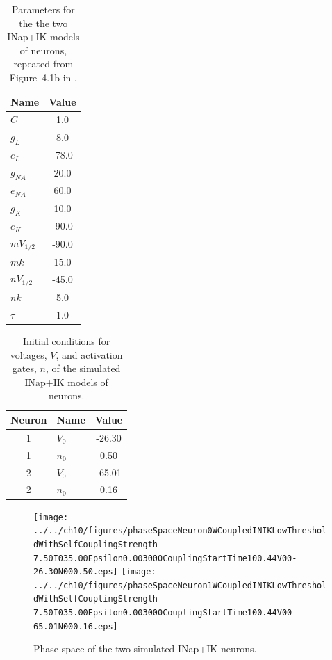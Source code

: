 \documentclass{article}
\begin{document}
\begin{table}
\begin{center}
\begin{tabular}{|l|c|}\hline
\multicolumn{1}{|c}{Name} & \multicolumn{1}{|c|}{Value}\\ \hline \hline
$C$ & 1.0 \\ \hline
$g_L$ & 8.0 \\ \hline
$e_L$ & -78.0 \\ \hline
$g_{NA}$ & 20.0 \\ \hline
$e_{NA}$ & 60.0 \\ \hline
$g_{K}$ & 10.0 \\ \hline
$e_{K}$ & -90.0 \\ \hline
$mV_{1/2}$ & -90.0 \\ \hline
$mk$ & 15.0 \\ \hline
$nV_{1/2}$ & -45.0 \\ \hline
$nk$ & 5.0 \\ \hline
$\tau$ & 1.0 \\ \hline
\end{tabular}
\end{center}
\caption{Parameters for the the two INap+IK models of neurons, repeated from
Figure~4.1b in \citet{izhikevich07}.}
\label{table:INapIKParams}
\end{table}

\begin{table}
\begin{center}
\begin{tabular}{|c|l|c|}\hline
\multicolumn{1}{|c}{Neuron} & \multicolumn{1}{|c}{Name} & \multicolumn{1}{|c|}{Value}\\ \hline \hline
1 & $V_0$ & -26.30 \\ \hline
1 & $n_0$ & 0.50 \\ \hline
2 & $V_0$ & -65.01 \\ \hline
2 & $n_0$ & 0.16 \\ \hline
\end{tabular}
\end{center}
\caption{Initial conditions for voltages, $V$, and activation gates, $n$, of the
simulated INap+IK models of neurons.}
\label{table:initialConditions}
\end{table}

\begin{figure}
\begin{center}
\texttt{[image: ../../ch10/figures/phaseSpaceNeuron0WCoupledINIKLowThresholdWithSelfCouplingStrength-7.50I035.00Epsilon0.003000CouplingStartTime100.44V00-26.30N000.50.eps]}
\texttt{[image: ../../ch10/figures/phaseSpaceNeuron1WCoupledINIKLowThresholdWithSelfCouplingStrength-7.50I035.00Epsilon0.003000CouplingStartTime100.44V00-65.01N000.16.eps]}

\caption{Phase space of the two simulated INap+IK neurons.}

\label{fig:neuronsInLimitCycle}
\end{center}
\end{figure} 
\end{document}
